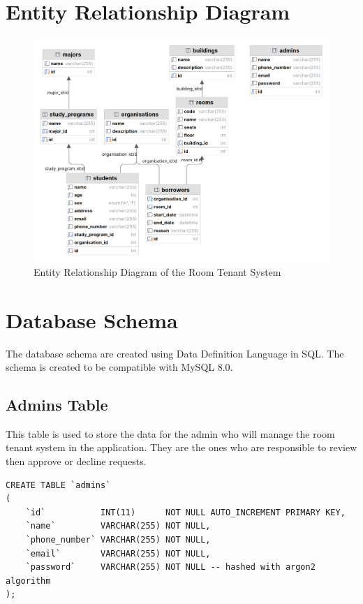 \documentclass[12pt,titlepage]{article}
\begin{document}
\section{Entity Relationship Diagram}
\begin{figure}[h]
    \centering
    \includegraphics[width=\textwidth]{./images/rts-erd.png}
    \caption{Entity Relationship Diagram of the Room Tenant System}
\end{figure}

\pagebreak

\section{Database Schema}
The database schema are created using Data Definition Language in SQL. 
The schema is created to be compatible with MySQL 8.0.

\subsection{Admins Table}
This table is used to store the data for the admin who will manage the room tenant system in the application.
They are the ones who are responsible to review then approve or decline requests.

\begin{verbatim}
CREATE TABLE `admins`
(
    `id`           INT(11)      NOT NULL AUTO_INCREMENT PRIMARY KEY,
    `name`         VARCHAR(255) NOT NULL,
    `phone_number` VARCHAR(255) NOT NULL,
    `email`        VARCHAR(255) NOT NULL,
    `password`     VARCHAR(255) NOT NULL -- hashed with argon2 algorithm
);
\end{verbatim}
\end{document}
